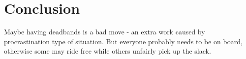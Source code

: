 \section{Conclusion}
Maybe having deadbands is a bad move - an extra work caused by procrastination type of situation.
But everyone probably needs to be on board, otherwise some may ride free while others unfairly pick up the slack.